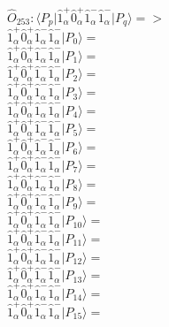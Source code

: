 \documentclass[14pt]{article}
\begin{document}
    $\hat{O}_{253}:  \langle{P_p}\vert \hat{1}_{\alpha}^{+}\hat{0}_{\alpha}^{+}\hat{1}_{\alpha}^{-}\hat{1}_{\alpha}^{-} \vert{P_q}\rangle => $ \\ 
    $ \hat{1}_{\alpha}^{+}\hat{0}_{\alpha}^{+}\hat{1}_{\alpha}^{-}\hat{1}_{\alpha}^{-} \vert{P_{0}}\rangle =  $ \\ 
    $ \hat{1}_{\alpha}^{+}\hat{0}_{\alpha}^{+}\hat{1}_{\alpha}^{-}\hat{1}_{\alpha}^{-} \vert{P_{1}}\rangle =  $ \\ 
    $ \hat{1}_{\alpha}^{+}\hat{0}_{\alpha}^{+}\hat{1}_{\alpha}^{-}\hat{1}_{\alpha}^{-} \vert{P_{2}}\rangle =  $ \\ 
    $ \hat{1}_{\alpha}^{+}\hat{0}_{\alpha}^{+}\hat{1}_{\alpha}^{-}\hat{1}_{\alpha}^{-} \vert{P_{3}}\rangle =  $ \\ 
    $ \hat{1}_{\alpha}^{+}\hat{0}_{\alpha}^{+}\hat{1}_{\alpha}^{-}\hat{1}_{\alpha}^{-} \vert{P_{4}}\rangle =  $ \\ 
    $ \hat{1}_{\alpha}^{+}\hat{0}_{\alpha}^{+}\hat{1}_{\alpha}^{-}\hat{1}_{\alpha}^{-} \vert{P_{5}}\rangle =  $ \\ 
    $ \hat{1}_{\alpha}^{+}\hat{0}_{\alpha}^{+}\hat{1}_{\alpha}^{-}\hat{1}_{\alpha}^{-} \vert{P_{6}}\rangle =  $ \\ 
    $ \hat{1}_{\alpha}^{+}\hat{0}_{\alpha}^{+}\hat{1}_{\alpha}^{-}\hat{1}_{\alpha}^{-} \vert{P_{7}}\rangle =  $ \\ 
    $ \hat{1}_{\alpha}^{+}\hat{0}_{\alpha}^{+}\hat{1}_{\alpha}^{-}\hat{1}_{\alpha}^{-} \vert{P_{8}}\rangle =  $ \\ 
    $ \hat{1}_{\alpha}^{+}\hat{0}_{\alpha}^{+}\hat{1}_{\alpha}^{-}\hat{1}_{\alpha}^{-} \vert{P_{9}}\rangle =  $ \\ 
    $ \hat{1}_{\alpha}^{+}\hat{0}_{\alpha}^{+}\hat{1}_{\alpha}^{-}\hat{1}_{\alpha}^{-} \vert{P_{10}}\rangle =  $ \\ 
    $ \hat{1}_{\alpha}^{+}\hat{0}_{\alpha}^{+}\hat{1}_{\alpha}^{-}\hat{1}_{\alpha}^{-} \vert{P_{11}}\rangle =  $ \\ 
    $ \hat{1}_{\alpha}^{+}\hat{0}_{\alpha}^{+}\hat{1}_{\alpha}^{-}\hat{1}_{\alpha}^{-} \vert{P_{12}}\rangle =  $ \\ 
    $ \hat{1}_{\alpha}^{+}\hat{0}_{\alpha}^{+}\hat{1}_{\alpha}^{-}\hat{1}_{\alpha}^{-} \vert{P_{13}}\rangle =  $ \\ 
    $ \hat{1}_{\alpha}^{+}\hat{0}_{\alpha}^{+}\hat{1}_{\alpha}^{-}\hat{1}_{\alpha}^{-} \vert{P_{14}}\rangle =  $ \\ 
    $ \hat{1}_{\alpha}^{+}\hat{0}_{\alpha}^{+}\hat{1}_{\alpha}^{-}\hat{1}_{\alpha}^{-} \vert{P_{15}}\rangle =  $ \\ 
    
\end{document}
